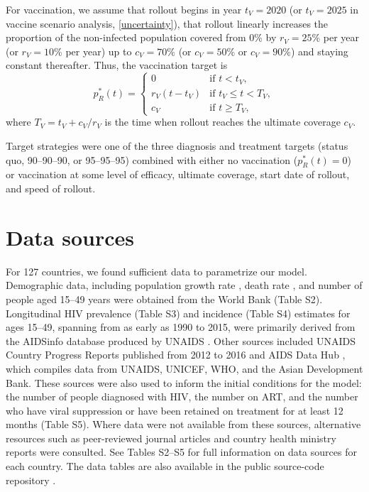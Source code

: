 \documentclass{article}
\begin{document}
For vaccination, we assume that rollout begins in year $t_V = 2020$
(or $t_V = 2025$ in vaccine scenario analysis, \autoref{uncertainty}),
that rollout linearly increases the proportion of the non-infected
population covered from 0\% by $r_V = 25\%$ per year (or $r_V = 10\%$
per year) up to $c_V = 70\%$ (or $c_V = 50\%$ or $c_V = 90\%$) and
staying constant thereafter.  Thus, the vaccination target is
\begin{equation}
  \label{vaccination_target}
  p_R^*(t) =
  \begin{cases}
    0 & \text{if $t < t_V$},
    \\
    r_V (t - t_V) & \text{if $t_V \leq t < T_V$},
    \\
    c_V & \text{if $t \geq T_V$},
  \end{cases}
\end{equation}
where $T_V = t_V + c_V / r_V$ is the time when rollout reaches
the ultimate coverage $c_V$.

Target strategies were one of the three diagnosis and treatment
targets (status quo, 90--90--90, or 95--95--95) combined with either
no vaccination ($p_R^*(t) = 0$) or vaccination at some level of
efficacy, ultimate coverage, start date of rollout, and speed of
rollout.


\section{Data sources}
\label{data_sources}

For 127 countries, we found sufficient data to parametrize our model.
Demographic data, including population growth rate \cite{WorldBankpg},
death rate \cite{World_Development_Indicators2013-ee}, and number of
people aged 15--49 years \cite{The_World_Bank2016-fd} were obtained
from the World Bank (Table S2). Longitudinal HIV prevalence (Table S3)
and incidence (Table S4) estimates for ages 15--49, spanning from as
early as 1990 to 2015, were primarily derived from the AIDSinfo
database produced by UNAIDS \cite{Unaids2016-an}. Other sources
included UNAIDS Country Progress Reports \cite{Unaids2016-am}
published from 2012 to 2016 and AIDS Data Hub \cite{AIDSdatahub-fg},
which compiles data from UNAIDS, UNICEF, WHO, and the Asian
Development Bank. These sources were also used to inform the initial
conditions for the model: the number of people diagnosed with HIV, the
number on ART, and the number who have viral suppression or have been
retained on treatment for at least 12 months (Table S5). Where data
were not available from these sources, alternative resources such as
peer-reviewed journal articles and country health ministry reports
were consulted.  See Tables S2--S5 for full information on data
sources for each country.  The data tables are also available in the
public source-code repository \cite{medlock2016-git}.
\end{document}
